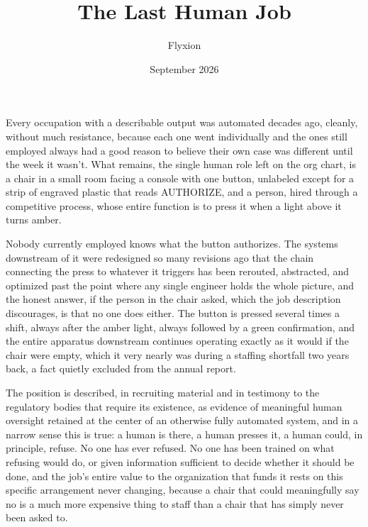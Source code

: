 \documentclass[11pt]{article}
\title{The Last Human Job}
\author{Flyxion}
\date{September 2026}
\begin{document}
\maketitle

Every occupation with a describable output was automated decades ago, cleanly, without much resistance, because each one went individually and the ones still employed always had a good reason to believe their own case was different until the week it wasn't. What remains, the single human role left on the org chart, is a chair in a small room facing a console with one button, unlabeled except for a strip of engraved plastic that reads AUTHORIZE, and a person, hired through a competitive process, whose entire function is to press it when a light above it turns amber.

Nobody currently employed knows what the button authorizes. The systems downstream of it were redesigned so many revisions ago that the chain connecting the press to whatever it triggers has been rerouted, abstracted, and optimized past the point where any single engineer holds the whole picture, and the honest answer, if the person in the chair asked, which the job description discourages, is that no one does either. The button is pressed several times a shift, always after the amber light, always followed by a green confirmation, and the entire apparatus downstream continues operating exactly as it would if the chair were empty, which it very nearly was during a staffing shortfall two years back, a fact quietly excluded from the annual report.

The position is described, in recruiting material and in testimony to the regulatory bodies that require its existence, as evidence of meaningful human oversight retained at the center of an otherwise fully automated system, and in a narrow sense this is true: a human is there, a human presses it, a human could, in principle, refuse. No one has ever refused. No one has been trained on what refusing would do, or given information sufficient to decide whether it should be done, and the job's entire value to the organization that funds it rests on this specific arrangement never changing, because a chair that could meaningfully say no is a much more expensive thing to staff than a chair that has simply never been asked to.
\end{document}
